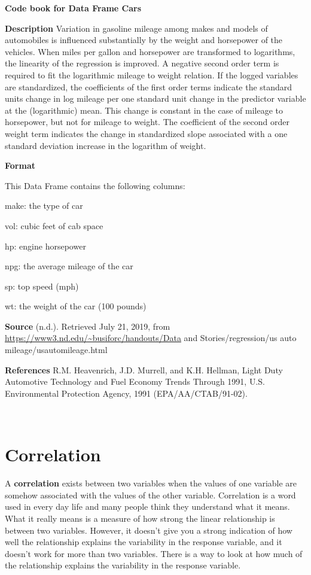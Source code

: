 \documentclass[
]{book}
\begin{document}
\textbf{Code book for Data Frame Cars}

\textbf{Description}
Variation in gasoline mileage among makes and models of automobiles is influenced substantially by the weight and horsepower of the vehicles. When miles per gallon and horsepower are transformed to logarithms, the linearity of the regression is improved. A negative second order term is required to fit the logarithmic mileage to weight relation. If the logged variables are standardized, the coefficients of the first order terms indicate the standard units change in log mileage per one standard unit change in the predictor variable at the (logarithmic) mean. This change is constant in the case of mileage to horsepower, but not for mileage to weight. The coefficient of the second order weight term indicates the change in standardized slope associated with a one standard deviation increase in the logarithm of weight.

\textbf{Format}

This Data Frame contains the following columns:

make: the type of car

vol: cubic feet of cab space

hp: engine horsepower

npg: the average mileage of the car

sp: top speed (mph)

wt: the weight of the car (100 pounds)

\textbf{Source}
(n.d.). Retrieved July 21, 2019, from \url{https://www3.nd.edu/~busiforc/handouts/Data} and Stories/regression/us auto mileage/usautomileage.html

\textbf{References}
R.M. Heavenrich, J.D. Murrell, and K.H. Hellman, Light Duty Automotive
Technology and Fuel Economy Trends Through 1991, U.S. Environmental Protection
Agency, 1991 (EPA/AA/CTAB/91-02).

\textbf{\\
}

\hypertarget{correlation}{%
\section{Correlation}\label{correlation}}

A \textbf{correlation} exists between two variables when the values of one variable are somehow associated with the values of the other variable. Correlation is a word used in every day life and many people think they understand what it means. What it really means is a measure of how strong the linear relationship is between two variables. However, it doesn't give you a strong indication of how well the relationship explains the variability in the response variable, and it doesn't work for more than two variables. There is a way to look at how much of the relationship explains the variability in the response variable.
\end{document}

